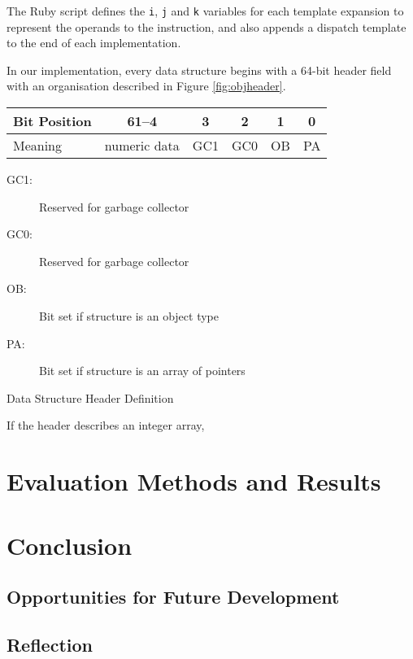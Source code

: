 		The Ruby script defines the \texttt{i}, \texttt{j} and \texttt{k} variables for each template expansion to represent the operands to the instruction, and also appends a dispatch template to the end of each implementation.
			
			
		
		In our implementation, every data structure begins with a 64-bit header field with an organisation described in Figure \ref{fig:objheader}. 
		
		\begin{myfigure}
			\begin{tabular}{|l|c| c| c|c|c|}
				\hline
				Bit Position & 61--4 & 3 & 2 & 1 & 0 \\
				\hline
				Meaning & numeric data & GC1 & GC0 & OB & PA \\
				\hline
			\end{tabular}
			\newline
			\begin{description}
				\item[GC1:] Reserved for garbage collector
				\item[GC0:] Reserved for garbage collector
				\item[OB:] Bit set if structure is an object type
				\item[PA:] Bit set if structure is an array of pointers
			\end{description}
			
			\caption{Data Structure Header Definition}
			\label{fig:objheader}
		\end{myfigure}
		
		If the header describes an integer array, 

\chapter{Evaluation Methods and Results}

\chapter{Conclusion}
	
	\section{Opportunities for Future Development}
	
	\section{Reflection}

\bibliographysection

